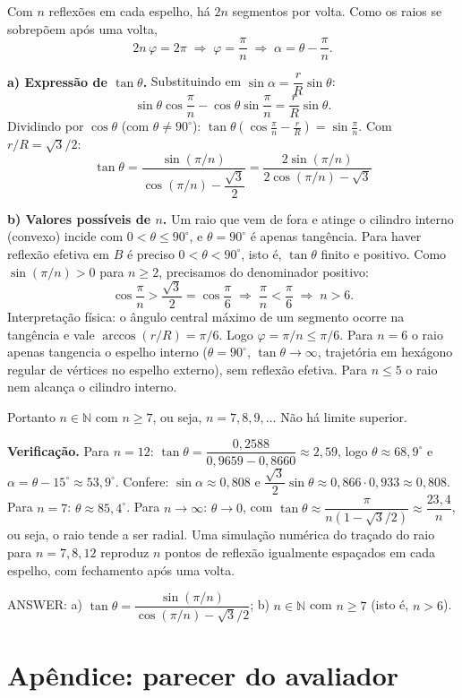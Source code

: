 \documentclass{article}%
\begin{document}
Com $n$ reflexões em cada espelho, há $2n$ segmentos por volta. Como os raios se sobrepõem após uma volta,
\[
2n\,\varphi=2\pi\;\Rightarrow\;\varphi=\frac{\pi}{n}\;\Rightarrow\;\alpha=\theta-\frac{\pi}{n}.
\]

\textbf{a) Expressão de $\tan\theta$.} Substituindo em $\sin\alpha=\dfrac{r}{R}\sin\theta$:
\[
\sin\theta\cos\frac{\pi}{n}-\cos\theta\sin\frac{\pi}{n}=\frac{r}{R}\sin\theta .
\]
Dividindo por $\cos\theta$ (com $\theta\neq 90^\circ$): $\tan\theta\left(\cos\frac{\pi}{n}-\frac{r}{R}\right)=\sin\frac{\pi}{n}$. Com $r/R=\sqrt3/2$:
\[
\boxed{\tan\theta=\frac{\sin(\pi/n)}{\cos(\pi/n)-\dfrac{\sqrt3}{2}}=\frac{2\sin(\pi/n)}{2\cos(\pi/n)-\sqrt3}}
\]

\textbf{b) Valores possíveis de $n$.} Um raio que vem de fora e atinge o cilindro interno (convexo) incide com $0<\theta\le 90^\circ$, e $\theta=90^\circ$ é apenas tangência. Para haver reflexão efetiva em $B$ é preciso $0<\theta<90^\circ$, isto é, $\tan\theta$ finito e positivo. Como $\sin(\pi/n)>0$ para $n\ge 2$, precisamos do denominador positivo:
\[
\cos\frac{\pi}{n}>\frac{\sqrt3}{2}=\cos\frac{\pi}{6}\;\Rightarrow\;\frac{\pi}{n}<\frac{\pi}{6}\;\Rightarrow\; n>6 .
\]
Interpretação física: o ângulo central máximo de um segmento ocorre na tangência e vale $\arccos(r/R)=\pi/6$. Logo $\varphi=\pi/n\le\pi/6$. Para $n=6$ o raio apenas tangencia o espelho interno ($\theta=90^\circ$, $\tan\theta\to\infty$, trajetória em hexágono regular de vértices no espelho externo), sem reflexão efetiva. Para $n\le5$ o raio nem alcança o cilindro interno.

Portanto $n\in\mathbb{N}$ com $n\ge 7$, ou seja, $n=7,8,9,\dots$ Não há limite superior.

\textbf{Verificação.} Para $n=12$: $\tan\theta=\dfrac{0{,}2588}{0{,}9659-0{,}8660}\approx 2{,}59$, logo $\theta\approx 68{,}9^\circ$ e $\alpha=\theta-15^\circ\approx 53{,}9^\circ$. Confere: $\sin\alpha\approx0{,}808$ e $\dfrac{\sqrt3}{2}\sin\theta\approx0{,}866\cdot0{,}933\approx0{,}808$. Para $n=7$: $\theta\approx85{,}4^\circ$. Para $n\to\infty$: $\theta\to0$, com $\tan\theta\approx\dfrac{\pi}{n(1-\sqrt3/2)}\approx\dfrac{23{,}4}{n}$, ou seja, o raio tende a ser radial. Uma simulação numérica do traçado do raio para $n=7,8,12$ reproduz $n$ pontos de reflexão igualmente espaçados em cada espelho, com fechamento após uma volta.

ANSWER: a) $\tan\theta=\dfrac{\sin(\pi/n)}{\cos(\pi/n)-\sqrt3/2}$; b) $n\in\mathbb{N}$ com $n\ge 7$ (isto é, $n>6$).%
\newpage%
\section*{Apêndice: parecer do avaliador}%
\end{document}

